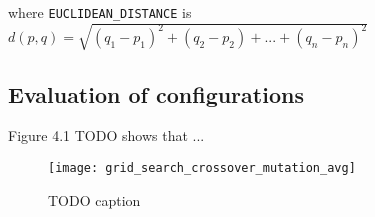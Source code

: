 where \texttt{EUCLIDEAN\_DISTANCE} is $d(p,q)=\sqrt{(q_1-p_1)^2+(q_2-p_2)+...+(q_n-p_n)^2}$

\subsection{Evaluation of configurations}
Figure 4.1 TODO shows that ...

\begin{figure}[h]
    \centering
    \texttt{[image: grid\_search\_crossover\_mutation\_avg]}
    \caption{TODO caption}
    \label{fig:grid_search_crossover_mutation_avg}
\end{figure}
